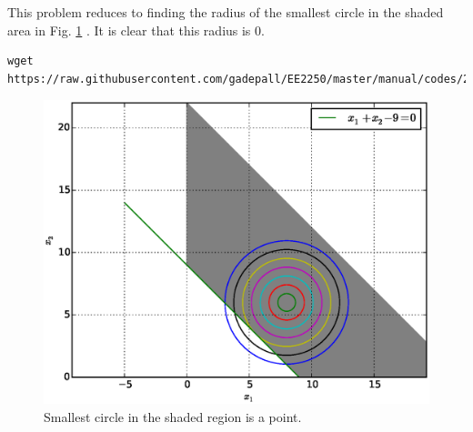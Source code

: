 \documentclass[journal,12pt,twocolumn]{IEEEtran}
\renewcommand\thesection{\arabic{section}}
\begin{document}
\begin{enumerate}[label=\thesection.\arabic*,ref=\thesection.\theenumi]
\solution 
This problem reduces to finding the radius of the smallest circle in the shaded area in Fig. \ref{fig.2.4} .  It is clear that this radius is 0.
%	
\begin{lstlisting}
wget https://raw.githubusercontent.com/gadepall/EE2250/master/manual/codes/2.4.py
\end{lstlisting}

%
\begin{figure}[!ht]
\centering
\includegraphics[width=\columnwidth]{./figs/2.4.eps}
\caption{ Smallest circle in the shaded region is a point.}
\label{fig.2.4}	
\end{figure}
%
\end{enumerate}
\end{document}
